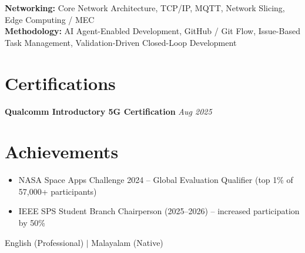 \documentclass[10pt,a4paper]{article}
\newcommand{\role}[2]{\textbf{#1} \hfill \textit{#2}}
\newcommand{\skillgroup}[2]{\textbf{#1:} #2}
\begin{document}
\skillgroup{Networking}{Core Network Architecture, TCP/IP, MQTT, Network Slicing, Edge Computing / MEC} \\

\skillgroup{Methodology}{AI Agent-Enabled Development, GitHub / Git Flow, Issue-Based Task Management, Validation-Driven Closed-Loop Development}

\section*{Certifications}

\role{Qualcomm Introductory 5G Certification}{Aug 2025}

\section*{Achievements}

\begin{itemize}
    \item NASA Space Apps Challenge 2024 -- Global Evaluation Qualifier (top 1\% of 57,000+ participants)
    \item IEEE SPS Student Branch Chairperson (2025--2026) -- increased participation by 50\%
\end{itemize}

\vspace{6pt}
\begin{center}
\small English (Professional) \quad $|$ \quad Malayalam (Native)
\end{center}
\end{document}
